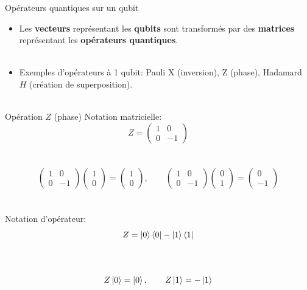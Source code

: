 \documentclass[aspectratio=169,12pt]{beamer}
\begin{document}
\begin{frame}{Opérateurs quantiques sur un qubit}
  \begin{itemize}[<+->]
    \setlength{\itemsep}{0.55em}
    \item Les \textbf{vecteurs} représentant les \textbf{qubits} sont transformés par des \textbf{matrices}
     représentant les \textbf{opérateurs quantiques}.\\~\\
    \item Exemples d'opérateurs à 1 qubit: Pauli X (inversion), Z (phase), Hadamard $H$ (création de superposition).\\~\\
  \end{itemize}
\end{frame}

\begin{frame}{Opération $Z$ (phase)}
  Notation matricielle:
  $$
    Z = \begin{pmatrix}1 & 0 \\ 0 & -1\end{pmatrix}
  $$\\~\\
  $$
    \begin{pmatrix}1 & 0 \\ 0 & -1\end{pmatrix}
    \begin{pmatrix}1\\0\end{pmatrix}=
    \begin{pmatrix}1\\0\end{pmatrix},
    \qquad
    \begin{pmatrix}1 & 0 \\ 0 & -1\end{pmatrix}
    \begin{pmatrix}0\\1\end{pmatrix}=
    \begin{pmatrix}0\\-1\end{pmatrix}
  $$
  ~\\~\\
  Notation d'opérateur: $$Z = \ket 0 \bra 0 - \ket 1 \bra 1$$\\~\\
  $$
    Z\ket 0 = \ket 0, \qquad
    Z\ket 1 = -\ket 1
  $$
  
\end{frame}
\end{document}
